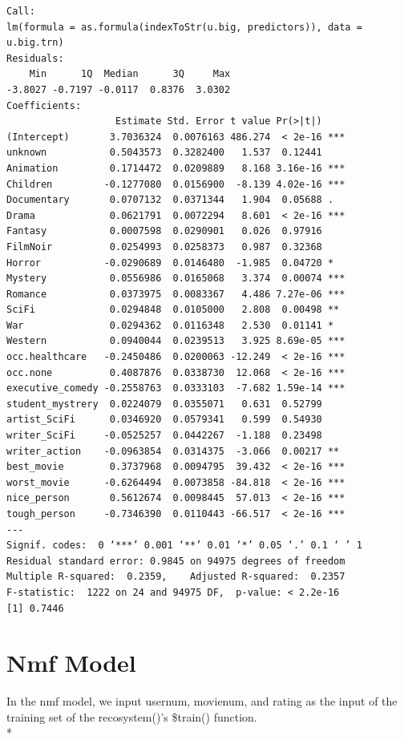 \documentclass[11pt]{article}
\newcommand\tab[1][0.5cm]{\hspace*{#1}}
\begin{document}
\begin{verbatim}
Call:
lm(formula = as.formula(indexToStr(u.big, predictors)), data = u.big.trn)
Residuals:
    Min      1Q  Median      3Q     Max 
-3.8027 -0.7197 -0.0117  0.8376  3.0302 
Coefficients:
                   Estimate Std. Error t value Pr(>|t|)    
(Intercept)       3.7036324  0.0076163 486.274  < 2e-16 ***
unknown           0.5043573  0.3282400   1.537  0.12441    
Animation         0.1714472  0.0209889   8.168 3.16e-16 ***
Children         -0.1277080  0.0156900  -8.139 4.02e-16 ***
Documentary       0.0707132  0.0371344   1.904  0.05688 .  
Drama             0.0621791  0.0072294   8.601  < 2e-16 ***
Fantasy           0.0007598  0.0290901   0.026  0.97916    
FilmNoir          0.0254993  0.0258373   0.987  0.32368    
Horror           -0.0290689  0.0146480  -1.985  0.04720 *  
Mystery           0.0556986  0.0165068   3.374  0.00074 ***
Romance           0.0373975  0.0083367   4.486 7.27e-06 ***
SciFi             0.0294848  0.0105000   2.808  0.00498 ** 
War               0.0294362  0.0116348   2.530  0.01141 *  
Western           0.0940044  0.0239513   3.925 8.69e-05 ***
occ.healthcare   -0.2450486  0.0200063 -12.249  < 2e-16 ***
occ.none          0.4087876  0.0338730  12.068  < 2e-16 ***
executive_comedy -0.2558763  0.0333103  -7.682 1.59e-14 ***
student_mystrery  0.0224079  0.0355071   0.631  0.52799    
artist_SciFi      0.0346920  0.0579341   0.599  0.54930    
writer_SciFi     -0.0525257  0.0442267  -1.188  0.23498    
writer_action    -0.0963854  0.0314375  -3.066  0.00217 ** 
best_movie        0.3737968  0.0094795  39.432  < 2e-16 ***
worst_movie      -0.6264494  0.0073858 -84.818  < 2e-16 ***
nice_person       0.5612674  0.0098445  57.013  < 2e-16 ***
tough_person     -0.7346390  0.0110443 -66.517  < 2e-16 ***
---
Signif. codes:  0 ‘***’ 0.001 ‘**’ 0.01 ‘*’ 0.05 ‘.’ 0.1 ‘ ’ 1
Residual standard error: 0.9845 on 94975 degrees of freedom
Multiple R-squared:  0.2359,	Adjusted R-squared:  0.2357 
F-statistic:  1222 on 24 and 94975 DF,  p-value: < 2.2e-16
[1] 0.7446
\end{verbatim}
\section{Nmf Model}
\tab{}In the nmf model, we input usernum, movienum, and rating as the input of the training set of the recosystem()'s \$train() function.
\\*
\end{document}
